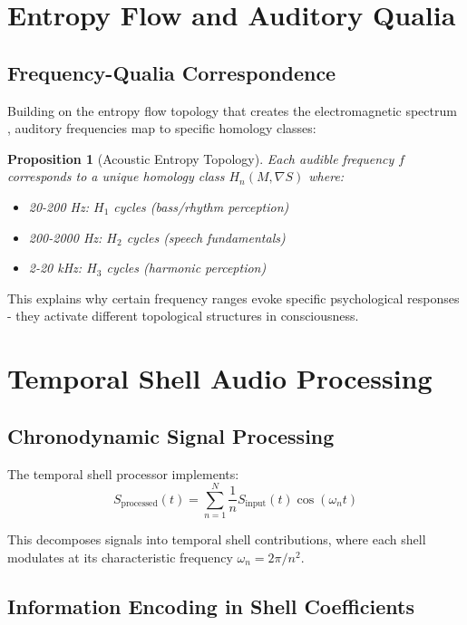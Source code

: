 \documentclass[12pt]{article}
\newtheorem{proposition}{Proposition}
\begin{document}
\section{Entropy Flow and Auditory Qualia}

\subsection{Frequency-Qualia Correspondence}

Building on the entropy flow topology that creates the electromagnetic spectrum \cite{consciousness2024}, auditory frequencies map to specific homology classes:

\begin{proposition}[Acoustic Entropy Topology]
Each audible frequency $f$ corresponds to a unique homology class $H_n(M, \nabla S)$ where:
\begin{itemize}
\item 20-200 Hz: $H_1$ cycles (bass/rhythm perception)
\item 200-2000 Hz: $H_2$ cycles (speech fundamentals)
\item 2-20 kHz: $H_3$ cycles (harmonic perception)
\end{itemize}
\end{proposition}

This explains why certain frequency ranges evoke specific psychological responses - they activate different topological structures in consciousness.

\section{Temporal Shell Audio Processing}

\subsection{Chronodynamic Signal Processing}

The temporal shell processor implements:
\begin{equation}
S_{\text{processed}}(t) = \sum_{n=1}^{N} \frac{1}{n} S_{\text{input}}(t) \cos(\omega_n t)
\end{equation}

This decomposes signals into temporal shell contributions, where each shell modulates at its characteristic frequency $\omega_n = 2\pi/n^2$.

\subsection{Information Encoding in Shell Coefficients}
\end{document}
